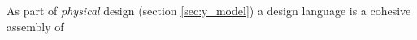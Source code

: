 \begin{definition} \label{def:design_language} 
  As part of \emph{physical} design (section \ref{sec:y_model}) a design language is a cohesive assembly of  \todo  \cite[p. 203-204]{benyon_14}
\end{definition}

